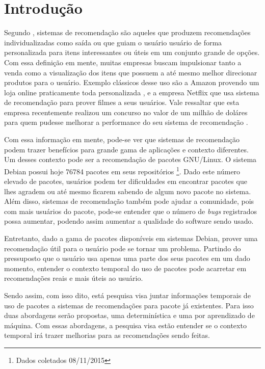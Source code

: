 \chapter*[Introdução]{Introdução}

Segundo , sistemas de recomendação são aqueles que
produzem recomendações individualizadas como saída ou que guiam o usuário
usuário de forma personalizada para itens interessantes ou úteis em um conjunto
grande de opções. Com essa definição em mente, muitas empresas buscam
impulsionar tanto a venda como a visualização dos itens que possuem a até mesmo
melhor direcionar produtos para o usuário. Exemplo clássicos desse uso são a
Amazon provendo um loja online praticamente toda personalizada
\cite{jannach2008finding}, e a empresa Netflix que usa sistema de recomendação
para prover filmes a seus usuários. Vale ressaltar que esta empresa recentemente
realizou um concurso no valor de um milhão de doláres para quem pudesse melhorar
a performance do seu sistema de recomendação \cite{koren2009matrix}.

Com essa informação em mente, pode-se ver que sistemas de recomendação podem
trazer benefícios para grande gama de aplicações e contexto diferentes. Um
desses contexto pode ser a recomendação de pacotes GNU/Linux. O sistema Debian
possui hoje 76784 pacotes em seus repositórios \footnote{Dados coletados
08/11/2015}. Dado este número elevado de pacotes, usuários podem ter
dificuldades em encontrar pacotes que lhes agradem ou até mesmo ficarem sabendo
de algum novo pacote no sistema. Além disso, sistemas de recomendação também
pode ajudar a comunidade, pois com mais usuários do pacote, pode-se entender que
o número de \textit{bugs} registrados possa aumentar, podendo assim aumentar a qualidade
do software sendo usado.

Entretanto, dado a gama de pacotes disponíveis em sistemas Debian, prover uma
recomendação útil para o usuário pode se tornar um problema. Partindo do
pressuposto que o usuário usa apenas uma parte dos seus pacotes em um dado
momento, entender o contexto temporal  do uso de pacotes pode acarretar em recomendações reais e
mais úteis ao usuário.

Sendo assim, com isso dito, está pesquisa visa juntar informações temporais de
uso de pacotes a sistemas de recomendações para pacote já existentes. Para isso duas abordagens
serão propostas, uma determinística e uma por aprendizado de máquina. Com essas abordagens, a pesquisa 
visa estão entender se o  contexto temporal irá trazer melhorias para as recomendações
sendo feitas.

